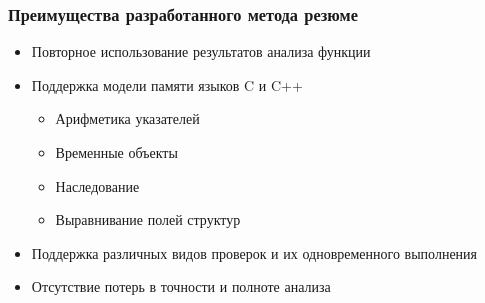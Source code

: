 \documentclass[hyperref={pdfpagelabels=false},10pt,gray]{beamer}
\begin{document}
\begin{frame}
\frametitle{Преимущества разработанного метода резюме}
\begin{itemize}
 \item Повторное использование результатов анализа функции
 \item Поддержка модели памяти языков C и C++
  \begin{itemize}
  \item Арифметика указателей
  \item Временные объекты
  \item Наследование
  \item Выравнивание полей структур
  \end{itemize}

 \item Поддержка различных видов проверок и их одновременного выполнения
 \item Отсутствие потерь в точности и полноте анализа
\end{itemize}
\end{frame}


\end{document}
